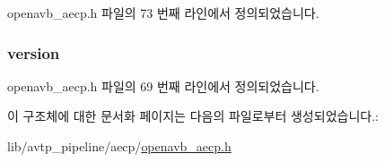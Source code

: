 openavb\+\_\+aecp.\+h 파일의 73 번째 라인에서 정의되었습니다.

\subsubsection[{\texorpdfstring{version}{version}}]{ version}\hypertarget{structopenavb__aecp__control__header__t_ae5d1ca2d5099c6a5f760c897505cb11b}{}\label{structopenavb__aecp__control__header__t_ae5d1ca2d5099c6a5f760c897505cb11b}


openavb\+\_\+aecp.\+h 파일의 69 번째 라인에서 정의되었습니다.



이 구조체에 대한 문서화 페이지는 다음의 파일로부터 생성되었습니다.\+:\begin{DoxyCompactItemize}
\item 
lib/avtp\+\_\+pipeline/aecp/\hyperlink{openavb__aecp_8h}{openavb\+\_\+aecp.\+h}\end{DoxyCompactItemize}
